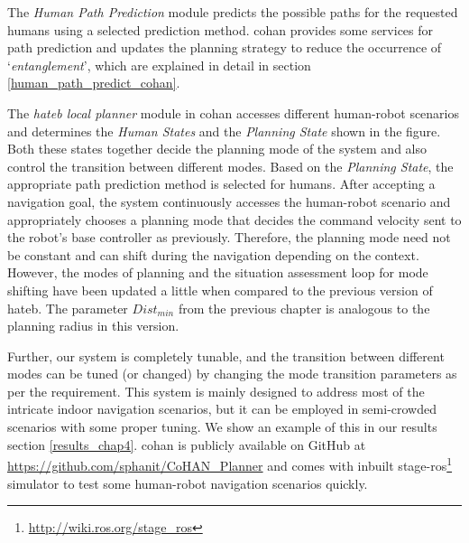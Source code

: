 The \textit{Human Path Prediction} module predicts the possible paths for the requested humans using a selected prediction method. \acrshort{cohan} provides some services for path prediction and updates the planning strategy to reduce the occurrence of `\textit{entanglement}', which are explained in detail in section \ref{human_path_predict_cohan}.

The \textit{\acrshort{hateb} local planner} module in \acrshort{cohan} accesses different human-robot scenarios and determines the \textit{Human States} and the \textit{Planning State} shown in the figure. Both these states together decide the planning mode of the system and also control the transition between different modes. Based on the \textit{Planning State}, the appropriate path prediction method is selected for humans. After accepting a navigation goal, the system continuously accesses the human-robot scenario and appropriately chooses a planning mode that decides the command velocity sent to the robot's base controller as previously. Therefore, the planning mode need not be constant and can shift during the navigation depending on the context. However, the modes of planning and the situation assessment loop for mode shifting have been updated a little when compared to the previous version of \acrshort{hateb}. The parameter $Dist_{min}$ from the previous chapter is analogous to the planning radius in this version.
 
Further, our system is completely tunable, and the transition between different modes can be tuned (or changed) by changing the mode transition parameters \cite{singamaneni2020hateb} as per the requirement. This system is mainly designed to address most of the intricate indoor navigation scenarios, but it can be employed in semi-crowded scenarios with some proper tuning. We show an example of this in our results section \ref{results_chap4}. \acrshort{cohan} is publicly available on GitHub at {\small {\url{https://github.com/sphanit/CoHAN_Planner}}} and comes with inbuilt stage-ros\footnote{\url{http://wiki.ros.org/stage_ros}} simulator to test some human-robot navigation scenarios quickly.

